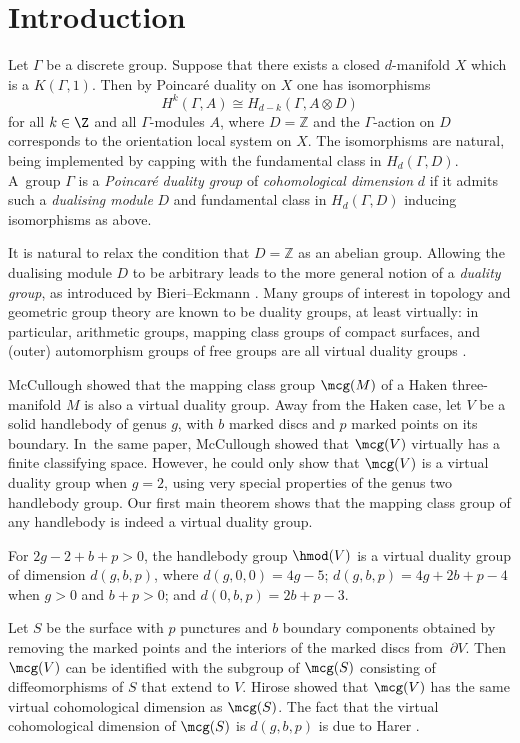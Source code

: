 \section{Introduction}
Let $\Gamma$ be a discrete group. Suppose that there exists a closed $d$-manifold $X$ which is a $K(\Gamma,1)$. Then by Poincaré duality on $X$ one has isomorphisms
\[
H^k(\Gamma,A) \cong H_{d-k}(\Gamma, A\otimes D)
\]
for all $k \in \Z$ and all $\Gamma$-modules $A$, where $D=\mathbb{Z}$ and the $\Gamma$-action on $D$ corresponds to the orientation local system on $X$. The isomorphisms are natural, being implemented by capping with the fundamental class in $H_d(\Gamma,D)$. A~group $\Gamma$ is a \emph{Poincaré duality group} of \emph{cohomological dimension} $d$ if it admits such a \emph{dualising module} $D$ and fundamental class in $H_d(\Gamma,D)$ inducing isomorphisms as above.

It is natural to relax the condition that $D=\mathbb{Z}$ as an abelian group. Allowing the dualising module $D$ to be arbitrary leads to the more general notion of a \emph{duality group}, as introduced by Bieri--Eckmann \cite{be}. Many groups of interest in topology and geometric group theory are known to be duality groups, at least virtually: in particular, arithmetic groups, mapping class groups of compact surfaces, and (outer) automorphism groups of free groups are all virtual duality groups \cite{borelserre,harer,bestvinafeighn}.

McCullough \cite{mccullough} showed that the mapping class group $\mcg(M)$ of a Haken three-manifold $M$ is also a virtual duality group. Away from the Haken case, let $V$ be a solid handlebody of genus $g$, with $b$ marked discs and $p$ marked points on its boundary. In~the same paper, McCullough showed that $\mcg(V)$ virtually has a finite classifying space. However, he could only show that $\mcg(V)$ is a virtual duality group when $g=2$, using very special properties of the genus two handlebody group. Our first main theorem shows that the mapping class group of any handlebody is indeed a virtual duality group.

\begin{thmA}\label{thm:A}
For $2g -2+ b +p > 0$, the handlebody group $\hmod(V)$ is a virtual duality
group of dimension $d(g, b, p)$, where $d(g, 0 , 0 ) = 4 g - 5 $; $d(g , b , p ) = 4 g + 2 b + p - 4$ when $g > 0$ and $b + p > 0$; and $d(0,b,p)=2b + p - 3$.
\end{thmA}

\begin{rem} Let $S$ be the surface with $p$ punctures and $b$ boundary components obtained by removing the marked points and the interiors of the marked discs from~$\partial V$. Then $\mcg(V)$ can be identified with the subgroup of $\mcg(S)$ consisting of diffeomorphisms of $S$ that extend to $V$. Hirose \cite{hirose} showed that $\mcg(V)$ has the same virtual cohomological dimension as $\mcg(S)$. The fact that the virtual cohomological dimension of $\mcg(S)$ is $d(g,b,p)$ is due to Harer \cite{harer}.
\end{rem}

